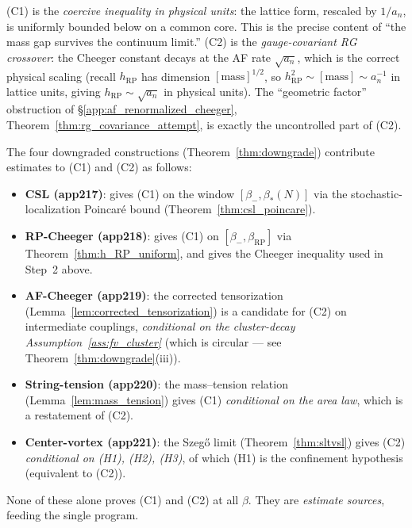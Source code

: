 \begin{remark}
\label{rem:C1_C2}
(C1) is the \emph{coercive inequality in physical units}: the
lattice form, rescaled by $1/a_{n}$, is uniformly bounded below
on a common core. This is the precise content of ``the mass gap
survives the continuum limit.'' (C2) is the \emph{gauge-covariant
RG crossover}: the Cheeger constant decays at the AF rate
$\sqrt{a_{n}}$, which is the correct physical scaling (recall
$h_{\mathrm{RP}}$ has dimension $[\mathrm{mass}]^{1/2}$, so
$h_{\mathrm{RP}}^{2}\sim[\mathrm{mass}]\sim a_{n}^{-1}$ in lattice
units, giving $h_{\mathrm{RP}}\sim\sqrt{a_{n}}$ in physical
units). The ``geometric factor'' obstruction of
\S\ref{app:af_renormalized_cheeger},
Theorem~\ref{thm:rg_covariance_attempt}, is exactly the
uncontrolled part of (C2).
\end{remark}

\begin{remark}
\label{rem:estimate_sources}
The four downgraded constructions (Theorem~\ref{thm:downgrade})
contribute estimates to (C1) and (C2) as follows:
\begin{itemize}
\item \textbf{CSL (app217)}: gives (C1) on the window
$[\beta_{-},\beta_{*}(N)]$ via the stochastic-localization
Poincar\'e bound (Theorem~\ref{thm:csl_poincare}).
\item \textbf{RP-Cheeger (app218)}: gives (C1) on
$[\beta_{-},\beta_{\mathrm{RP}}]$ via
Theorem~\ref{thm:h_RP_uniform}, and gives the Cheeger inequality
used in Step~2 above.
\item \textbf{AF-Cheeger (app219)}: the corrected tensorization
(Lemma~\ref{lem:corrected_tensorization}) is a candidate for (C2)
on intermediate couplings, \emph{conditional on the cluster-decay
Assumption~\ref{ass:fv_cluster}} (which is circular --- see
Theorem~\ref{thm:downgrade}(iii)).
\item \textbf{String-tension (app220)}: the mass--tension relation
(Lemma~\ref{lem:mass_tension}) gives (C1) \emph{conditional on the
area law}, which is a restatement of (C2).
\item \textbf{Center-vortex (app221)}: the Szeg\H{o} limit
(Theorem~\ref{thm:sltvsl}) gives (C2) \emph{conditional on (H1),
(H2), (H3)}, of which (H1) is the confinement hypothesis
(equivalent to (C2)).
\end{itemize}
None of these alone proves (C1) and (C2) at all $\beta$. They are
\emph{estimate sources}, feeding the single program.
\end{remark}

